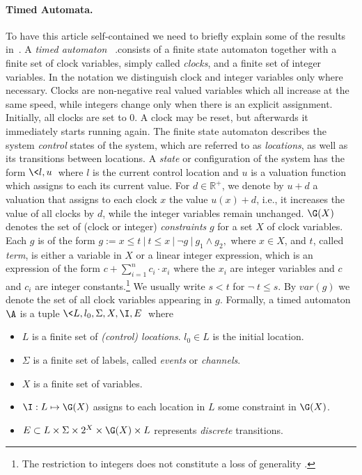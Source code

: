 \documentclass{eptcs}
\begin{document}
\paragraph{Timed Automata.}
To have this article self-contained we need to briefly explain some of the
results in~\cite{BaLeSm09}.  A {\em timed automaton}
~\cite{bluebook,alur94}.consists of a finite state automaton together with a
finite set of clock variables, simply called {\em clocks}, and a finite set of
integer variables.  In the notation we distinguish clock and integer variables
only where necessary.  Clocks are non-negative real valued variables which all
increase at the same speed, while integers change only when there is an
explicit assignment.  Initially, all clocks are set to $0$.  A clock may be
reset, but afterwards it immediately starts running again.  The finite state
automaton describes the system {\em control} states of the system, which are
referred to as \emph{locations}, as well as its transitions between locations.
A {\em state} or configuration of the system has the form $\< l,u\>$ where $l$
is the current control location and $u$ is a valuation function which assigns
to each its current value.  For $d{\in} {\mathbb{R^+}}$, we denote by $u+d$ a
valuation that assigns to each clock $x$ the value $u(x)+d$, i.e., it
increases the value of all clocks by $d$, while the integer variables remain
unchanged.
$\G(X)$ denotes the set of (clock or integer) {\em constraints} $g$ for a set
  $X$ of clock variables. Each $g$ is of the form $g:=x\leq t~|~t\leq
  x~|~\lnot g~|~ g_1\land g_2,$ where $x\in X$, and $t$, called {\em term}, is
  either a variable in $X$ or a linear integer expression, which is an
  expression of the form $c+\sum_{i=1}^nc_i\cdot x_i$ where the $x_i$ are
  integer variables and $c$ and $c_i$ are integer constants.\footnote{The
    restriction to integers does not constitute a loss of generality
    \cite[Section 4.1]{alur94}.}  We usually write $s<t$ for $\lnot\; t\leq
  s$. By $var(g)$ we denote the set of all clock variables appearing in $g$.
Formally, a timed automaton $\A$ is a tuple $\< L,l_0,\Sigma,X,\I,E \>$ where 
\begin{itemize}
\item $L$ is a finite set of {\em (control) locations}. $l_0\in L$ is the initial location.
\item $\Sigma$ is a finite set of labels, called {\em events} or {\em channels}.  
\item $X$ is a finite set of variables. 
\item 
$\I:L\mapsto \G(X)$ assigns to each location in $L$ some constraint in $\G(X)$.   
\item $E\subset L\times \Sigma\times 2^{X}\times \G(X)\times L$ represents
  {\em discrete} transitions.
\end{itemize}
\end{document}
